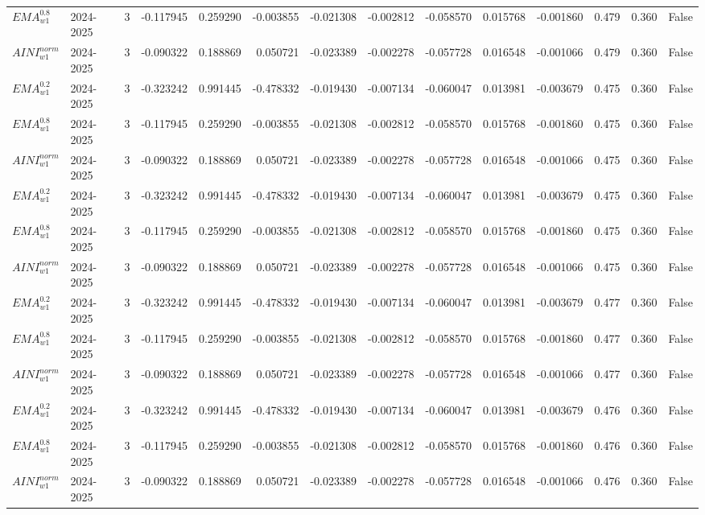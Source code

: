 \begin{tabular}{@{}llrrrrrrrrrlll@{}}
$EMA^{0.8}_{w1}$ & 2024-2025 & 3 & -0.117945 & 0.259290 & -0.003855 & -0.021308 & -0.002812 & -0.058570 & 0.015768 & -0.001860 & 0.479 & 0.360 & False \\
$AINI^{norm}_{w1}$ & 2024-2025 & 3 & -0.090322 & 0.188869 & 0.050721 & -0.023389 & -0.002278 & -0.057728 & 0.016548 & -0.001066 & 0.479 & 0.360 & False \\
$EMA^{0.2}_{w1}$ & 2024-2025 & 3 & -0.323242 & 0.991445 & -0.478332 & -0.019430 & -0.007134 & -0.060047 & 0.013981 & -0.003679 & 0.475 & 0.360 & False \\
$EMA^{0.8}_{w1}$ & 2024-2025 & 3 & -0.117945 & 0.259290 & -0.003855 & -0.021308 & -0.002812 & -0.058570 & 0.015768 & -0.001860 & 0.475 & 0.360 & False \\
$AINI^{norm}_{w1}$ & 2024-2025 & 3 & -0.090322 & 0.188869 & 0.050721 & -0.023389 & -0.002278 & -0.057728 & 0.016548 & -0.001066 & 0.475 & 0.360 & False \\
$EMA^{0.2}_{w1}$ & 2024-2025 & 3 & -0.323242 & 0.991445 & -0.478332 & -0.019430 & -0.007134 & -0.060047 & 0.013981 & -0.003679 & 0.475 & 0.360 & False \\
$EMA^{0.8}_{w1}$ & 2024-2025 & 3 & -0.117945 & 0.259290 & -0.003855 & -0.021308 & -0.002812 & -0.058570 & 0.015768 & -0.001860 & 0.475 & 0.360 & False \\
$AINI^{norm}_{w1}$ & 2024-2025 & 3 & -0.090322 & 0.188869 & 0.050721 & -0.023389 & -0.002278 & -0.057728 & 0.016548 & -0.001066 & 0.475 & 0.360 & False \\
$EMA^{0.2}_{w1}$ & 2024-2025 & 3 & -0.323242 & 0.991445 & -0.478332 & -0.019430 & -0.007134 & -0.060047 & 0.013981 & -0.003679 & 0.477 & 0.360 & False \\
$EMA^{0.8}_{w1}$ & 2024-2025 & 3 & -0.117945 & 0.259290 & -0.003855 & -0.021308 & -0.002812 & -0.058570 & 0.015768 & -0.001860 & 0.477 & 0.360 & False \\
$AINI^{norm}_{w1}$ & 2024-2025 & 3 & -0.090322 & 0.188869 & 0.050721 & -0.023389 & -0.002278 & -0.057728 & 0.016548 & -0.001066 & 0.477 & 0.360 & False \\
$EMA^{0.2}_{w1}$ & 2024-2025 & 3 & -0.323242 & 0.991445 & -0.478332 & -0.019430 & -0.007134 & -0.060047 & 0.013981 & -0.003679 & 0.476 & 0.360 & False \\
$EMA^{0.8}_{w1}$ & 2024-2025 & 3 & -0.117945 & 0.259290 & -0.003855 & -0.021308 & -0.002812 & -0.058570 & 0.015768 & -0.001860 & 0.476 & 0.360 & False \\
$AINI^{norm}_{w1}$ & 2024-2025 & 3 & -0.090322 & 0.188869 & 0.050721 & -0.023389 & -0.002278 & -0.057728 & 0.016548 & -0.001066 & 0.476 & 0.360 & False \\

\end{tabular}
